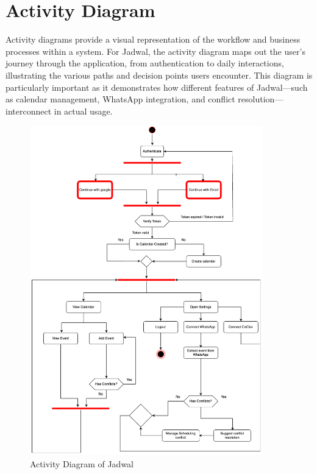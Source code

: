 \section{Activity Diagram}

Activity diagrams provide a visual representation of the workflow and business processes within a system. For Jadwal, the activity diagram maps out the user's journey through the application, from authentication to daily interactions, illustrating the various paths and decision points users encounter. This diagram is particularly important as it demonstrates how different features of Jadwal—such as calendar management, WhatsApp integration, and conflict resolution—interconnect in actual usage.

\begin{figure}[!h]
    \centering
    \includegraphics[width=0.9\textwidth]{images/activity-diagram.png}
    \caption{Activity Diagram of Jadwal}
    \label{fig:activity-diagram}
\end{figure}


